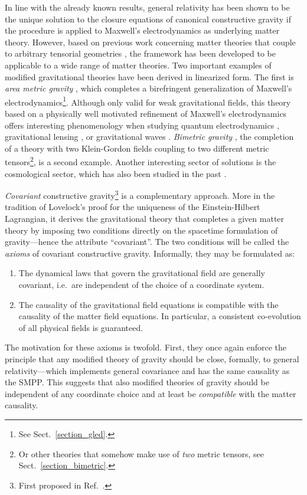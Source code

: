 In line with the already known results, general relativity has been shown to be the unique solution to the closure equations of canonical constructive gravity if the procedure is applied to Maxwell's electrodynamics as underlying matter theory. \cite{Witte_2014} However, based on previous work concerning matter theories that couple to arbitrary tensorial geometries \cite{R_tzel_2011,Rivera_2012}, the framework has been developed to be applicable to a wide range of matter theories. Two important examples of modified gravitational theories have been derived in linearized form. The first is \emph{area metric gravity} \cite{Alex_2020_2}, which completes a birefringent generalization of Maxwell's electrodynamics\footnote{See Sect.~\ref{section_gled}.}. Although only valid for weak gravitational fields, this theory based on a physically well motivated refinement of Maxwell's electrodynamics offers interesting phenomenology when studying quantum electrodynamics \cite{GrosseHolz_2017}, gravitational lensing \cite{Schuller_2017}, or gravitational waves \cite{Alex_2019}. \emph{Bimetric gravity} \cite{Wierzba_2018,Beier_2018}, the completion of a theory with two Klein-Gordon fields coupling to two different metric tensors\footnote{Or other theories that somehow make use of \emph{two} metric tensors, see Sect.~\ref{section_bimetric}.}, is a second example. Another interesting sector of solutions is the cosmological sector, which has also been studied in the past \cite{Duell_2020}.

\emph{Covariant} constructive gravity\footnote{First proposed in Ref.\ \cite{Alex_2020}.} is a complementary approach. More in the tradition of Lovelock's proof \cite{Lovelock_1969,Lovelock_1971,Lovelock_1972} for the uniqueness of the Einstein-Hilbert Lagrangian, it derives the gravitational theory that completes a given matter theory by imposing two conditions directly on the spacetime formulation of gravity---hence the attribute ``covariant''. The two conditions will be called the \emph{axioms} of covariant constructive gravity. Informally, they may be formulated as:
\begin{enumerate}
  \item The dynamical laws that govern the gravitational field are generally covariant, i.e.\ are independent of the choice of a coordinate system.
  \item The causality of the gravitational field equations is compatible with the causality of the matter field equations. In particular, a consistent co-evolution of all physical fields is guaranteed.
\end{enumerate}
The motivation for these axioms is twofold. First, they once again enforce the principle that any modified theory of gravity should be close, formally, to general relativity---which implements general covariance and has the same causality as the SMPP\@. This suggests that also modified theories of gravity should be independent of any coordinate choice and at least be \emph{compatible} with the matter causality.

